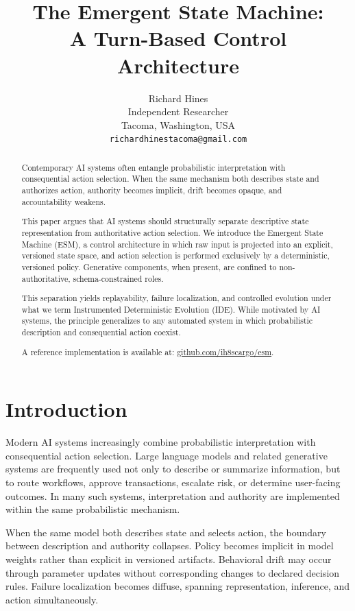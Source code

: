 \documentclass[11pt]{article}
\date{}
\title{The Emergent State Machine:\\
A Turn-Based Control Architecture}
\author{
Richard Hines\\
\small Independent Researcher\\
\small Tacoma, Washington, USA\\
\small \texttt{richardhinestacoma@gmail.com}\\
}
\begin{document}
\maketitle

\begin{abstract}
Contemporary AI systems often entangle probabilistic interpretation with consequential action selection. When the same mechanism both describes state and authorizes action, authority becomes implicit, drift becomes opaque, and accountability weakens.

This paper argues that AI systems should structurally separate descriptive state representation from authoritative action selection. We introduce the Emergent State Machine (ESM), a control architecture in which raw input is projected into an explicit, versioned state space, and action selection is performed exclusively by a deterministic, versioned policy. Generative components, when present, are confined to non-authoritative, schema-constrained roles.

This separation yields replayability, failure localization, and controlled evolution under what we term Instrumented Deterministic Evolution (IDE). While motivated by AI systems, the principle generalizes to any automated system in which probabilistic description and consequential action coexist.

A reference implementation is available at:
\href{https://github.com/ih8scargo/esm}{github.com/ih8scargo/esm}.

\end{abstract}



\section{Introduction}
Modern AI systems increasingly combine probabilistic interpretation with consequential action selection. Large language models and related generative systems are frequently used not only to describe or summarize information, but to route workflows, approve transactions, escalate risk, or determine user-facing outcomes. In many such systems, interpretation and authority are implemented within the same probabilistic mechanism.

When the same model both describes state and selects action, the boundary between description and authority collapses. Policy becomes implicit in model weights rather than explicit in versioned artifacts. Behavioral drift may occur through parameter updates without corresponding changes to declared decision rules. Failure localization becomes diffuse, spanning representation, inference, and action simultaneously.
\end{document}
